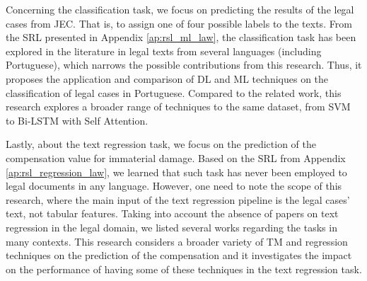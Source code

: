 Concerning the classification task, we focus on predicting the results of the legal cases from \gls{JEC}. That is, to assign one of four possible labels to the texts. From the \gls{SRL} presented in Appendix \ref{ap:rsl_ml_law}, the classification task has been explored in the literature in legal texts from several languages (including Portuguese), which narrows
the possible contributions from this research. Thus, it proposes the application and comparison of \gls{DL} and \gls{ML} techniques on the classification of legal cases in Portuguese. Compared to the related work, this research explores a broader range of techniques to the same dataset, from \gls{SVM} to \gls{Bi-LSTM} with Self Attention. 


Lastly, about the text regression task, we focus on the prediction of the compensation value for immaterial damage. Based on the \gls{SRL} from Appendix \ref{ap:rsl_regression_law}, we learned that such task has never been employed to legal documents in any language. However, one need to note the scope of this research, where the main input of the text regression pipeline is the legal cases' text, not tabular features. Taking into account the absence of papers on text regression in the legal domain, we listed several works regarding the tasks in many contexts. This research considers a broader variety of \gls{TM} and regression techniques on the prediction of the compensation and it investigates the impact on the performance of having some of these techniques in the text regression task.






